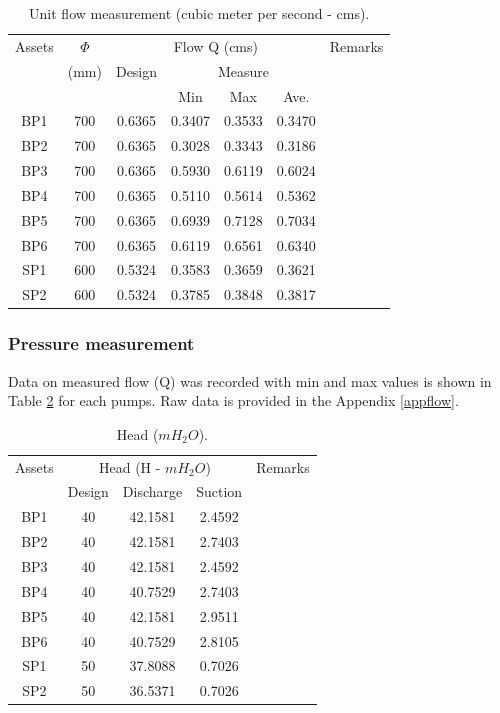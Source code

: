 \begin{table}[!h]
	\caption{Unit flow measurement (cubic meter per second - cms).}
	\label{ch04_tbl_flow01}
	{\footnotesize
\begin{tabular}{c|c|c|c|c|c|l}
	\hline
	Assets & $\Phi$  & \multicolumn{4}{c|}{Flow Q (cms)} & Remarks \\ 
	\cline{3-6}
	& (mm) & Design & \multicolumn{3}{c|}{Measure} &  \\ 
	\cline{4-6}
	&  &  & Min & Max & Ave. &  \\ 
	\hline
	BP1 & 700 & 0.6365 & 0.3407 & 0.3533 & 0.3470  &  \\ 
	BP2 & 700 & 0.6365 & 0.3028 & 0.3343 & 0.3186  &  \\ 
	BP3 & 700 & 0.6365 & 0.5930 & 0.6119 & 0.6024  &  \\ 
	BP4 & 700 & 0.6365 & 0.5110 & 0.5614 & 0.5362  &  \\ 
	BP5 & 700 & 0.6365 & 0.6939 & 0.7128 & 0.7034  &  \\ 
	BP6 & 700 & 0.6365 & 0.6119 & 0.6561 & 0.6340  &  \\ 
	SP1 & 600 & 0.5324 & 0.3583 & 0.3659 & 0.3621  &  \\ 
	SP2 & 600 & 0.5324 & 0.3785 & 0.3848 & 0.3817  &  \\ 
	\hline
\end{tabular}
	}
\end{table}

\subsubsection{Pressure measurement} \label{ch04pressure}

Data on measured flow (Q) was recorded with min and max values is shown in Table \ref{ch04_tbl_flow02} for each pumps. Raw data is provided in the Appendix \ref{appflow}.

\begin{table}[!h]
	\caption{Head ($mH_2O$).}
	\label{ch04_tbl_flow02}
	{\footnotesize
\begin{tabular}{c|c|c|c|l}
	\hline
	Assets & \multicolumn{3}{c|}{Head (H - $mH_2O$)} & Remarks \\ 
	\cline{2-4}
	& Design & Discharge & Suction &  \\ 
	\hline
	BP1 & 40 & 42.1581 & 2.4592 &  \\ 
	BP2 & 40 & 42.1581 & 2.7403 &  \\ 
	BP3 & 40 & 42.1581 & 2.4592 &  \\ 
	BP4 & 40 & 40.7529 & 2.7403 &  \\ 
	BP5 & 40 & 42.1581 & 2.9511 &  \\ 
	BP6 & 40 & 40.7529 & 2.8105 &  \\ 
	SP1 & 50 & 37.8088 & 0.7026 &  \\ 
	SP2 & 50 & 36.5371 & 0.7026 &  \\ 
	\hline
\end{tabular}

	}
\end{table}




